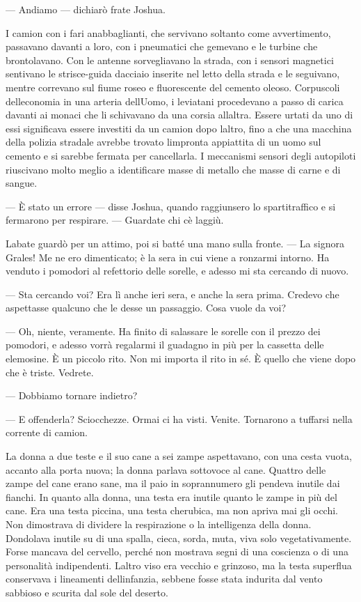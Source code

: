 --- Andiamo --- dichiarò frate Joshua.

I camion con i fari anabbaglianti, che servivano soltanto come
avvertimento, passavano davanti a loro, con i pneumatici che gemevano e
le turbine che brontolavano. Con le antenne sorvegliavano la strada, con
i sensori magnetici sentivano le strisce-guida d\textquotesingle acciaio
inserite nel letto della strada e le seguivano, mentre correvano sul
fiume roseo e fluorescente del cemento oleoso. Corpuscoli
dell\textquotesingle economia in una arteria dell\textquotesingle Uomo,
i leviatani procedevano a passo di carica davanti ai monaci che li
schivavano da una corsia all\textquotesingle altra. Essere urtati da uno
di essi significava essere investiti da un camion dopo
l\textquotesingle altro, fino a che una macchina della polizia stradale
avrebbe trovato l\textquotesingle impronta appiattita di un uomo sul
cemento e si sarebbe fermata per cancellarla. I meccanismi sensori degli
autopiloti riuscivano molto meglio a identificare masse di metallo che
masse di carne e di sangue.

--- È stato un errore --- disse Joshua, quando raggiunsero lo
spartitraffico e si fermarono per respirare. --- Guardate chi
c\textquotesingle è laggiù.

L\textquotesingle abate guardò per un attimo, poi si batté una mano
sulla fronte. --- La signora Grales! Me ne ero dimenticato; è la sera in
cui viene a ronzarmi intorno. Ha venduto i pomodori al refettorio delle
sorelle, e adesso mi sta cercando di nuovo.

--- Sta cercando voi? Era lì anche ieri sera, e anche la sera prima.
Credevo che aspettasse qualcuno che le desse un passaggio. Cosa vuole da
voi?

--- Oh, niente, veramente. Ha finito di salassare le sorelle con il
prezzo dei pomodori, e adesso vorrà regalarmi il guadagno in più per la
cassetta delle elemosine. È un piccolo rito. Non mi importa il rito in
sé. È quello che viene dopo che è triste. Vedrete.

--- Dobbiamo tornare indietro?

--- E offenderla? Sciocchezze. Ormai ci ha visti. Venite. Tornarono a
tuffarsi nella corrente di camion.

La donna a due teste e il suo cane a sei zampe aspettavano, con una
cesta vuota, accanto alla porta nuova; la donna parlava sottovoce al
cane. Quattro delle zampe del cane erano sane, ma il paio in
soprannumero gli pendeva inutile dai fianchi. In quanto alla donna, una
testa era inutile quanto le zampe in più del cane. Era una testa
piccina, una testa cherubica, ma non apriva mai gli occhi. Non
dimostrava di dividere la respirazione o la intelligenza della donna.
Dondolava inutile su di una spalla, cieca, sorda, muta, viva solo
vegetativamente. Forse mancava del cervello, perché non mostrava segni
di una coscienza o di una personalità indipendenti.
L\textquotesingle altro viso era vecchio e grinzoso, ma la testa
superflua conservava i lineamenti dell\textquotesingle infanzia, sebbene
fosse stata indurita dal vento sabbioso e scurita dal sole del deserto.

